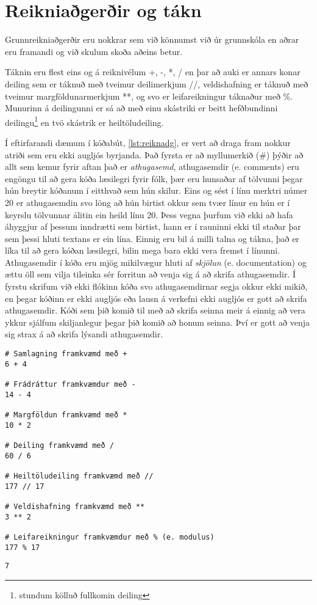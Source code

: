 \section{Reikniaðgerðir og tákn}
Grunnreikniaðgerðir eru nokkrar sem við könnumst við úr grunnskóla en aðrar eru framandi og við skulum skoða aðeins betur.

Táknin eru flest eins og á reiknivélum +, -, *, / en þar að auki er annars konar deiling sem er táknuð með tveimur deilimerkjum //, veldishafning er táknuð með tveimur margföldunarmerkjum **, og svo er leifareikningur táknaður með \%.
Munurinn á deilingunni er sá að með einu skástriki er beitt hefðbundinni deilingu\footnote{stundum kölluð fullkomin deiling} en tvö skástrik er heiltöludeiling.

Í eftirfarandi dæmum í kóðabút, \ref{lst:reiknadg}, er vert að draga fram nokkur atriði sem eru ekki augljós byrjanda. 
Það fyrsta er að myllumerkið (\#) þýðir að allt sem kemur fyrir aftan það er \textit{athugasemd}, athugasemdir (e. comments) eru engöngu til að gera kóða læsilegri fyrir fólk, þær eru hunsaðar af tölvunni þegar hún breytir kóðanum í eitthvað sem hún skilur.
Eins og sést í línu merktri númer 20 er athugasemdin svo löng að hún birtist okkur sem tvær línur en hún er í keyrslu tölvunnar álitin ein heild línu 20.
Þess vegna þurfum við ekki að hafa áhyggjur af þessum inndrætti sem birtist, hann er í rauninni ekki til staðar þar sem þessi hluti textans er ein lína.
Einnig eru bil á milli talna og tákna, það er líka til að gera kóðan læsilegri, bilin mega bara ekki vera fremst í línunni.
Athugasemdir í kóða eru mjög mikilvægur hluti af \emph{skjölun} (e. documentation) og ættu öll sem vilja tileinka sér forritun að venja sig á að skrifa athugasemdir.
Í fyrstu skrifum við ekki flókinn kóða svo athugasemdirnar segja okkur ekki mikið, en þegar kóðinn er ekki augljós eða lausn á verkefni ekki augljós er gott að skrifa athugasemdir.
Kóði sem þið komið til með að skrifa seinna meir á einnig að vera ykkur sjálfum skiljanlegur þegar þið komið að honum seinna.
Því er gott að venja sig strax á að skrifa lýsandi athugasemdir. 

\begin{lstlisting}[caption=Reikniaðgerðir, label=lst:reiknadg]
# Samlagning framkvæmd með + 
6 + 4 

# Frádráttur framkvæmdur með -
14 - 4 

# Margföldun framkvæmd með * 
10 * 2 

# Deiling framkvæmd með / 
60 / 6 

# Heiltöludeiling framkvæmd með //
177 // 17

# Veldishafning framkvæmd með **
3 ** 2

# Leifareikningur framkvæmdur með % (e. modulus)
177 % 17
\end{lstlisting}
\lstset{style=uttak}
\begin{lstlisting}
7
\end{lstlisting}
\lstset{style=venjulegt}

